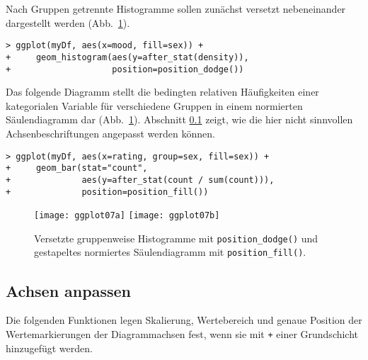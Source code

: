 Nach Gruppen getrennte Histogramme sollen zunächst versetzt nebeneinander dargestellt werden (Abb.\ \ref{fig:ggplot07}).
\begin{lstlisting}
> ggplot(myDf, aes(x=mood, fill=sex)) +
+     geom_histogram(aes(y=after_stat(density)),
+                    position=position_dodge())
\end{lstlisting}

Das folgende Diagramm stellt die bedingten relativen Häufigkeiten einer kategorialen Variable für verschiedene Gruppen in einem normierten Säulendiagramm dar (Abb.\ \ref{fig:ggplot07}). Abschnitt \ref{sec:ggplotAxis} zeigt, wie die hier nicht sinnvollen Achsenbeschriftungen angepasst werden können.
\begin{lstlisting}
> ggplot(myDf, aes(x=rating, group=sex, fill=sex)) +
+     geom_bar(stat="count",
+              aes(y=after_stat(count / sum(count))),
+              position=position_fill())
\end{lstlisting}

\begin{figure}[ht]
\centering
\texttt{[image: ggplot07a]}
\texttt{[image: ggplot07b]}
\vspace*{-0.5em}
\caption{Versetzte gruppenweise Histogramme mit \lstinline!position_dodge()! und gestapeltes normiertes Säulendiagramm mit \lstinline!position_fill()!.}
\label{fig:ggplot07}
\end{figure}

\subsection{Achsen anpassen}
\label{sec:ggplotAxis}

Die folgenden Funktionen legen Skalierung, Wertebereich und genaue Position der Wertemarkierungen der Diagrammachsen fest, wenn sie mit \lstinline!+! einer Grundschicht hinzugefügt werden.

